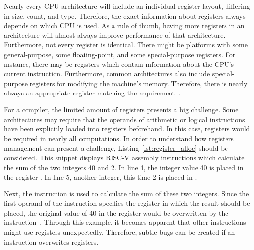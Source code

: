Nearly every CPU architecture will include an individual register layout, differing in size, count, and type.
Therefore, the exact information about registers always depends on which CPU is used.
As a rule of thumb, having more registers in an architecture will almost always improve performance of that architecture.
Furthermore, not every register is identical.
There might be platforms with some general-purpose, some floating-point, and some special-purpose registers.
For instance, there may be registers which contain information about the CPU's current instruction.
Furthermore, common architectures also include special-purpose registers for modifying the machine's memory.
Therefore, there is nearly always an appropriate register matching the requirement~\cite[Chapter~2]{Dandamudi2005}.


For a compiler, the limited amount of registers presents a big challenge.
Some architectures may require that the operands of arithmetic or logical instructions have been explicitly loaded into registers beforehand.
In this case, registers would be required in nearly all computations.
In order to understand how registers management can present a challenge, Listing~\ref{lst:register_alloc} should be considered.
This snippet displays RISC-V assembly instructions which calculate the sum of the two integets 40 and 2.
In line 4, the integer value 40 is placed in the register .
In line 5, another integer, this time 2 is placed in .

Next, the  instruction is used to calculate the sum of these two integers.
Since the first operand of the instruction specifies the register in which the result should be placed,
the original value of 40 in the register  would be overwritten by the instruction~\cite[reference]{Patterson2017}.
Through this example, it becomes apparent that other instructions might use registers unexpectedly.
Therefore, subtle bugs can be created if an instruction overwrites registers.

